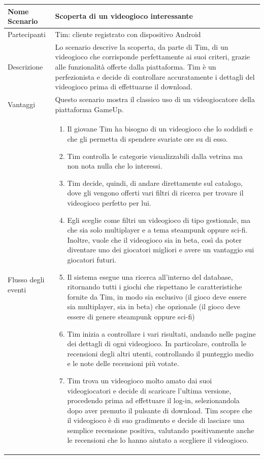 	\small\begin{tabular}{|| l | p{30em} ||} 
	\hline
	Nome Scenario & Scoperta di un videogioco interessante\\
	\hline
	Partecipanti & Tim: cliente registrato con dispositivo Android\\
	\hline
	Descrizione & Lo scenario descrive la scoperta, da parte di Tim, di un videogioco che corrisponde perfettamente ai suoi criteri, grazie alle funzionalità offerte dalla piattaforma. Tim è un perfezionista e decide di controllare accuratamente i dettagli del videogioco prima di effettuarne il download.\\
	\hline
	Vantaggi & Questo scenario mostra il classico uso di un videogiocatore della piattaforma GameUp.\\
	\hline
	Flusso degli eventi &
	\begin{enumerate}
		\item Il giovane Tim ha bisogno di un videogioco che lo soddisfi e che gli permetta di spendere svariate ore su di esso.
		\item Tim controlla le categorie visualizzabili dalla vetrina ma non nota nulla che lo interessi.
		\item Tim decide, quindi, di andare direttamente sul catalogo, dove gli vengono offerti vari filtri di ricerca per trovare il videogioco perfetto per lui.
		\item Egli sceglie come filtri un videogioco di tipo gestionale, ma che sia solo multiplayer e a tema steampunk oppure sci-fi. Inoltre, vuole che il videogioco sia in beta, così da poter diventare uno dei giocatori migliori e avere un vantaggio sui giocatori futuri.
		\item Il sistema esegue una ricerca all’interno del database, ritornando tutti i giochi che rispettano le caratteristiche fornite da Tim, in modo sia esclusivo (il gioco deve essere sia multiplayer, sia in beta) che opzionale (il gioco deve essere di genere steampunk oppure sci-fi)
		\item Tim inizia a controllare i vari risultati, andando nelle pagine dei dettagli di ogni videogioco. In particolare, controlla le recensioni degli altri utenti, controllando il punteggio medio e le note delle recensioni più votate.
		\item Tim trova un videogioco molto amato dai suoi videogiocatori e decide di scaricare l’ultima versione, procedendo prima ad effettuare il log-in, selezionandola dopo aver premuto il pulsante di download. Tim scopre che il videogioco è di suo gradimento e decide di lasciare una semplice recensione positiva, valutando positivamente anche le recensioni che lo hanno aiutato a scegliere il videogioco.			
	\end{enumerate} \\
	\hline
	\end{tabular}

